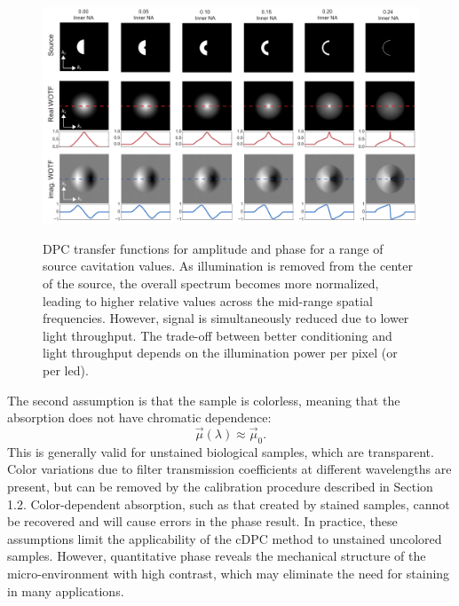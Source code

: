 \begin{figure}[tb]
    \centering
    \includegraphics[width=\textwidth]{figures/fig_phase_dpc_opt_transfer.pdf}
    \label{fig:phase:cavitated_transfer_functions}
    \caption{
    DPC transfer functions for amplitude and phase for a range of source cavitation values. As illumination is removed from the center of the source, the overall spectrum becomes more normalized, leading to higher relative values across the mid-range spatial frequencies. However, signal is simultaneously reduced due to lower light throughput. The trade-off between better conditioning and light throughput depends on the illumination power per pixel (or per led).}
\end{figure}


The second assumption is that the sample is colorless, meaning that the absorption does not have chromatic dependence:
\begin{equation} \label{outEq:monochrome}
\vec{\mu}(\lambda) \approx \vec{\mu}_0.
\end{equation}
\noindent This is generally valid for unstained biological samples, which are transparent. Color variations due to filter transmission coefficients at different wavelengths are present, but can be removed by the calibration procedure described in Section 1.2. Color-dependent absorption, such as that created by stained samples, cannot be recovered and will cause errors in the phase result. In practice, these assumptions limit the applicability of the cDPC method to unstained uncolored samples. However, quantitative phase reveals the mechanical structure of the micro-environment with high contrast, which may eliminate the need for staining in many applications.

